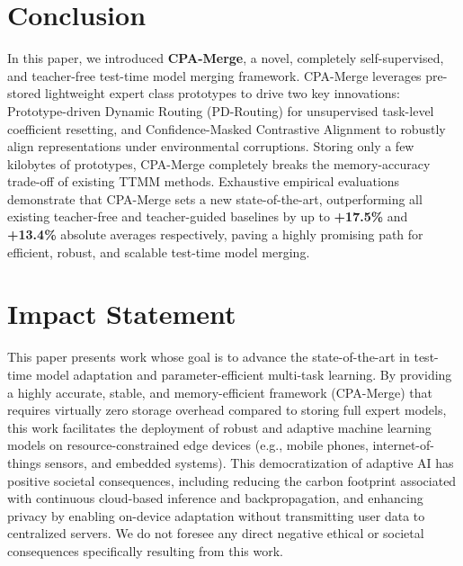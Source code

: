 \documentclass{article}
\theoremstyle{plain}
\theoremstyle{definition}
\theoremstyle{remark}
\begin{document}
\section{Conclusion}
\label{submission-conclusion}

In this paper, we introduced \textbf{CPA-Merge}, a novel, completely self-supervised, and teacher-free test-time model merging framework. CPA-Merge leverages pre-stored lightweight expert class prototypes to drive two key innovations: Prototype-driven Dynamic Routing (PD-Routing) for unsupervised task-level coefficient resetting, and Confidence-Masked Contrastive Alignment to robustly align representations under environmental corruptions. Storing only a few kilobytes of prototypes, CPA-Merge completely breaks the memory-accuracy trade-off of existing TTMM methods. Exhaustive empirical evaluations demonstrate that CPA-Merge sets a new state-of-the-art, outperforming all existing teacher-free and teacher-guided baselines by up to \textbf{+17.5\%} and \textbf{+13.4\%} absolute averages respectively, paving a highly promising path for efficient, robust, and scalable test-time model merging.

\section*{Impact Statement}

This paper presents work whose goal is to advance the state-of-the-art in test-time model adaptation and parameter-efficient multi-task learning. By providing a highly accurate, stable, and memory-efficient framework (CPA-Merge) that requires virtually zero storage overhead compared to storing full expert models, this work facilitates the deployment of robust and adaptive machine learning models on resource-constrained edge devices (e.g., mobile phones, internet-of-things sensors, and embedded systems). This democratization of adaptive AI has positive societal consequences, including reducing the carbon footprint associated with continuous cloud-based inference and backpropagation, and enhancing privacy by enabling on-device adaptation without transmitting user data to centralized servers. We do not foresee any direct negative ethical or societal consequences specifically resulting from this work.

\nocite{*}



\clearpage
\appendix
\onecolumn
{}
\end{document}
